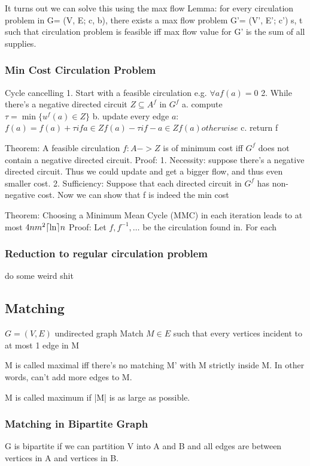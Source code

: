 It turns out we can solve this using the max flow
Lemma: for every circulation problem in G= (V, E; c, b), there exists a max flow
problem G'= (V', E'; c') s, t such that circulation problem is feasible iff max
flow value for G' is the sum of all supplies.


\subsubsection{Min Cost Circulation Problem}
Cycle cancelling
1. Start with a feasible circulation e.g. $\forall a f(a) = 0$
2. While there's a negative directed circuit $Z\subseteq A^f$ in $G^f$
   a. compute $\tau = \min \{u^f(a) \in Z\}$
   b. update every edge $a$: $f(a) = f(a) + \tau if a \in Z f(a) - \tau if -a \in Z f(a) otherwise$
   c. return f

Theorem: A feasible circulation $f: A -> Z$ is of minimum cost iff
$G^f$ does not contain a negative directed circuit.
Proof:
1. Necessity: suppose there's a negative directed circuit. Thus we
could update and get a bigger flow, and thus even smaller cost.
2. Sufficiency: Suppose that each directed circuit in $G^f$ has non-negative cost.  Now we can show that f is indeed the min cost

Theorem: Choosing a Minimum Mean Cycle (MMC) in each iteration leads to at most $4nm^2\lceil\ln\rceil n$
Proof:
Let $f, f^{-1},\ldots$ be the circulation found in.  For each 

\subsubsection{Reduction to regular circulation problem}
do some weird shit



\subsection{Matching}
$G=(V,E)$ undirected graph
Match $M\in E$ such that every vertices incident to at most 1 edge in M

M is called maximal iff there's no matching M' with M strictly inside M.  In
other words, can't add more edges to M.

M is called maximum if |M| is as large as possible.

\subsubsection{Matching in Bipartite Graph}
G is bipartite if we can partition V into A and B and all edges are between
vertices in A and vertices in B.

